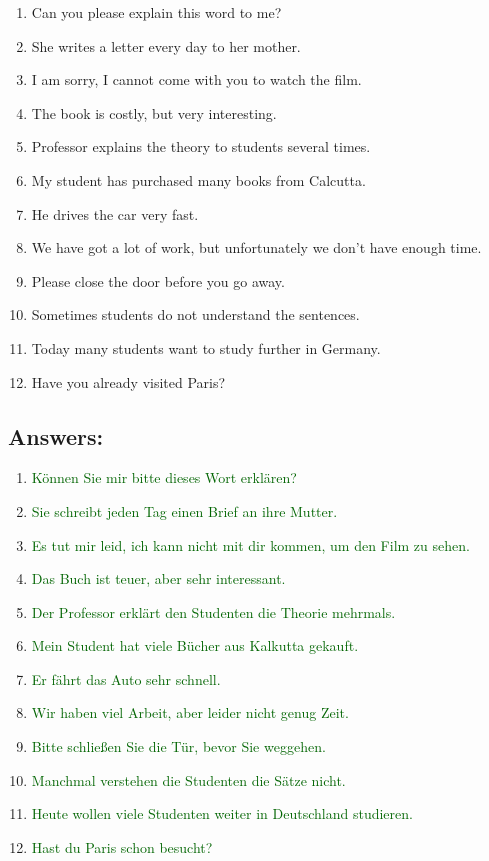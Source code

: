 \documentclass[12pt]{article}
\begin{document}
\begin{enumerate}
    \item Can you please explain this word to me?
    \item She writes a letter every day to her mother.
    \item I am sorry, I cannot come with you to watch the film.
    \item The book is costly, but very interesting.
    \item Professor explains the theory to students several times.
    \item My student has purchased many books from Calcutta.
    \item He drives the car very fast.
    \item We have got a lot of work, but unfortunately we don't have enough time.
    \item Please close the door before you go away.
    \item Sometimes students do not understand the sentences.
    \item Today many students want to study further in Germany.
    \item Have you already visited Paris?
\end{enumerate}

\subsection*{Answers:}
\begin{enumerate}
    \item \textcolor{darkgreen}{Können Sie mir  bitte dieses Wort erklären?}
    \item \textcolor{darkgreen}{Sie schreibt jeden Tag einen Brief an ihre Mutter.}
    \item \textcolor{darkgreen}{Es tut mir leid, ich kann nicht mit dir kommen, um den Film zu sehen.}
    \item \textcolor{darkgreen}{Das Buch ist teuer, aber sehr interessant.}
    \item \textcolor{darkgreen}{Der Professor erklärt den Studenten die Theorie mehrmals.}
    \item \textcolor{darkgreen}{Mein Student hat viele Bücher aus Kalkutta gekauft.}
    \item \textcolor{darkgreen}{Er fährt das Auto sehr schnell.}
    \item \textcolor{darkgreen}{Wir haben viel Arbeit, aber leider nicht genug Zeit.}
    \item \textcolor{darkgreen}{Bitte schließen Sie die Tür, bevor Sie weggehen.}
    \item \textcolor{darkgreen}{Manchmal verstehen die Studenten die Sätze nicht.}
    \item \textcolor{darkgreen}{Heute wollen viele Studenten weiter in Deutschland studieren.}
    \item \textcolor{darkgreen}{Hast du Paris schon besucht?}
\end{enumerate}
\end{document}
